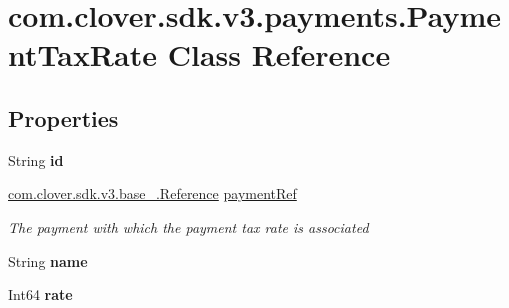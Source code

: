 \hypertarget{classcom_1_1clover_1_1sdk_1_1v3_1_1payments_1_1_payment_tax_rate}{}\section{com.\+clover.\+sdk.\+v3.\+payments.\+Payment\+Tax\+Rate Class Reference}
\label{classcom_1_1clover_1_1sdk_1_1v3_1_1payments_1_1_payment_tax_rate}
\subsection*{Properties}
\begin{DoxyCompactItemize}
\item 
\mbox{\label{classcom_1_1clover_1_1sdk_1_1v3_1_1payments_1_1_payment_tax_rate_a06f1f9fc8c88196ee1f0ee8ca29dbbda}} 
String {\bfseries id}
\item 
\hyperlink{classcom_1_1clover_1_1sdk_1_1v3_1_1base___1_1_reference}{com.\+clover.\+sdk.\+v3.\+base\+\_\+.\+Reference} \hyperlink{classcom_1_1clover_1_1sdk_1_1v3_1_1payments_1_1_payment_tax_rate_a8071470577ecf642ac8aefe86e9f4ad6}{payment\+Ref}
\begin{DoxyCompactList}\small\item\em The payment with which the payment tax rate is associated \end{DoxyCompactList}\item 
\mbox{\label{classcom_1_1clover_1_1sdk_1_1v3_1_1payments_1_1_payment_tax_rate_a99d17d8c96f5f05749775317b1a269ca}} 
String {\bfseries name}
\item 
\mbox{\label{classcom_1_1clover_1_1sdk_1_1v3_1_1payments_1_1_payment_tax_rate_abf291d4f05f8169e2b07edce2eb5ab25}} 
Int64 {\bfseries rate}
\item 
\mbox{\label{classcom_1_1clover_1_1sdk_1_1v3_1_1payments_1_1_payment_tax_rate_abdd1607b2b38b407423e987c8b22b73d}} 

\end{DoxyCompactItemize}
